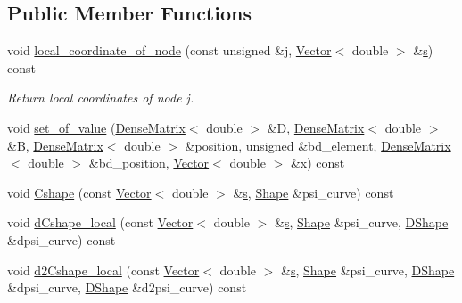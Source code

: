 \subsection*{Public Member Functions}
\begin{DoxyCompactItemize}
\item 
void \hyperlink{classoomph_1_1C1CurvedElementShape_3_012_00_01NNODE__1D_01_4_af67d209a5cf65825e78389318dc395e6}{local\+\_\+coordinate\+\_\+of\+\_\+node} (const unsigned \&j, \hyperlink{classoomph_1_1Vector}{Vector}$<$ double $>$ \&\hyperlink{cfortran_8h_ab7123126e4885ef647dd9c6e3807a21c}{s}) const
\begin{DoxyCompactList}\small\item\em Return local coordinates of node j. \end{DoxyCompactList}\item 
void \hyperlink{classoomph_1_1C1CurvedElementShape_3_012_00_01NNODE__1D_01_4_a40cd0a35dbc0402d7161f58c69d059b5}{set\+\_\+of\+\_\+value} (\hyperlink{classoomph_1_1DenseMatrix}{Dense\+Matrix}$<$ double $>$ \&D, \hyperlink{classoomph_1_1DenseMatrix}{Dense\+Matrix}$<$ double $>$ \&B, \hyperlink{classoomph_1_1DenseMatrix}{Dense\+Matrix}$<$ double $>$ \&position, unsigned \&bd\+\_\+element, \hyperlink{classoomph_1_1DenseMatrix}{Dense\+Matrix}$<$ double $>$ \&bd\+\_\+position, \hyperlink{classoomph_1_1Vector}{Vector}$<$ double $>$ \&x) const
\item 
void \hyperlink{classoomph_1_1C1CurvedElementShape_3_012_00_01NNODE__1D_01_4_a3f5542eebff8cce73b2a6cd0487fa9b7}{Cshape} (const \hyperlink{classoomph_1_1Vector}{Vector}$<$ double $>$ \&\hyperlink{cfortran_8h_ab7123126e4885ef647dd9c6e3807a21c}{s}, \hyperlink{classoomph_1_1Shape}{Shape} \&psi\+\_\+curve) const
\item 
void \hyperlink{classoomph_1_1C1CurvedElementShape_3_012_00_01NNODE__1D_01_4_aa2eae369074920a107f6117b3b152520}{d\+Cshape\+\_\+local} (const \hyperlink{classoomph_1_1Vector}{Vector}$<$ double $>$ \&\hyperlink{cfortran_8h_ab7123126e4885ef647dd9c6e3807a21c}{s}, \hyperlink{classoomph_1_1Shape}{Shape} \&psi\+\_\+curve, \hyperlink{classoomph_1_1DShape}{D\+Shape} \&dpsi\+\_\+curve) const
\item 
void \hyperlink{classoomph_1_1C1CurvedElementShape_3_012_00_01NNODE__1D_01_4_ae39e21f6c15e0544355c7b1119631409}{d2\+Cshape\+\_\+local} (const \hyperlink{classoomph_1_1Vector}{Vector}$<$ double $>$ \&\hyperlink{cfortran_8h_ab7123126e4885ef647dd9c6e3807a21c}{s}, \hyperlink{classoomph_1_1Shape}{Shape} \&psi\+\_\+curve, \hyperlink{classoomph_1_1DShape}{D\+Shape} \&dpsi\+\_\+curve, \hyperlink{classoomph_1_1DShape}{D\+Shape} \&d2psi\+\_\+curve) const

\end{DoxyCompactItemize}
